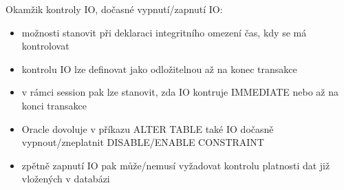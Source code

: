 \documentclass{szzclass}
\begin{document}
Okamžik kontroly IO, dočasné vypnutí/zapnutí IO:
\begin{itemize}
  \item možnosti stanovit při deklaraci integritního omezení čas, kdy se má kontrolovat
  \item kontrolu IO lze definovat jako odložitelnou až na konec transakce
  \item v rámci session pak lze stanovit, zda IO kontruje IMMEDIATE nebo až na konci transakce
  \item Oracle dovoluje v příkazu ALTER TABLE také IO dočasně vypnout/zneplatnit DISABLE/ENABLE CONSTRAINT
  \item zpětně zapnutí IO pak může/nemusí vyžadovat kontrolu platnosti dat již vložených v databázi
\end{itemize}



\end{document}
